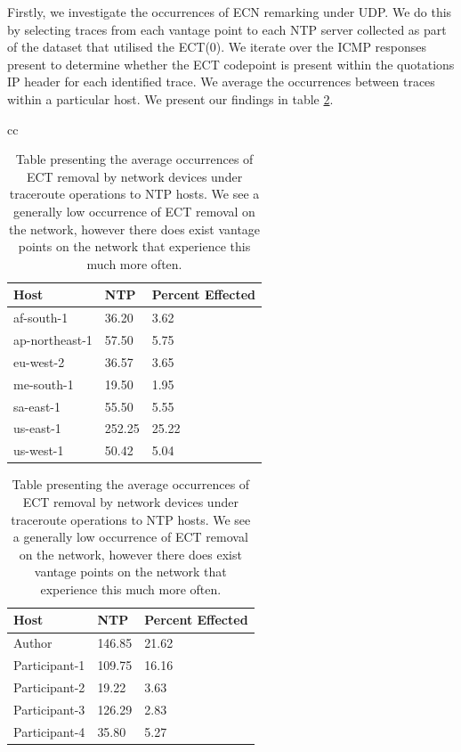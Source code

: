 \documentclass{l4proj}
\begin{document}
Firstly, we investigate the occurrences of ECN remarking under UDP. We do this by selecting traces from each vantage point to each NTP server collected as part of the dataset that utilised the ECT(0). We iterate over the ICMP responses present to determine whether the ECT codepoint is present within the quotations IP header for each identified trace. We average the occurrences between traces within a particular host. We present our findings in table \ref{tab:ntpect}.

\begin{table}[H]
\begin{tabular}{cc}
\begin{minipage}{.5\linewidth}
\begin{tabular}{|l|l|l|}
\hline
Host           & NTP    & Percent Effected \\ \hline
af-south-1     & 36.20  & 3.62             \\ \hline
ap-northeast-1 & 57.50  & 5.75             \\ \hline
eu-west-2      & 36.57  & 3.65             \\ \hline
me-south-1     & 19.50  & 1.95             \\ \hline
sa-east-1      & 55.50  & 5.55             \\ \hline
us-east-1      & 252.25 & 25.22            \\ \hline
us-west-1      & 50.42  & 5.04             \\ \hline
\end{tabular}
\end{minipage}

\begin{minipage}{.5\linewidth}
\begin{tabular}{|l|l|l|}
\hline
Host          & NTP    & Percent Effected \\ \hline
Author        & 146.85 & 21.62            \\ \hline
Participant-1 & 109.75 & 16.16            \\ \hline
Participant-2 & 19.22  & 3.63             \\ \hline
Participant-3 & 126.29 & 2.83            \\ \hline
Participant-4 & 35.80  & 5.27             \\ \hline
\end{tabular}
\end{minipage}
\end{tabular}

\caption{Table presenting the average occurrences of ECT removal by network devices under traceroute operations to NTP hosts. We see a generally low occurrence of ECT removal on the network, however there does exist vantage points on the network that experience this much more often.}
\label{tab:ntpect}

\end{table}
\end{document}
